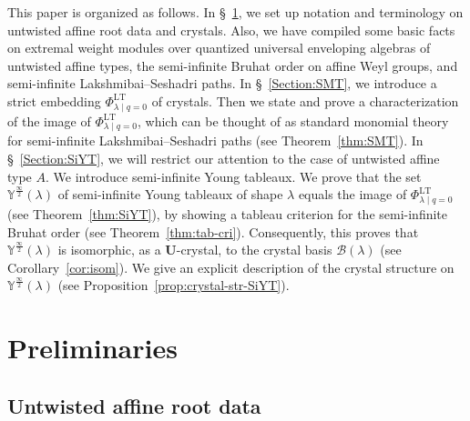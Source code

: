 \documentclass[ALCO,ThmDefs,Unicode,epreuves]{cedram}
\renewcommand{\U}{\mathbf{U}}
\newcommand{\si}{\frac{\infty}{2}}
\DeclareMathOperator{\LT}{LT}
\begin{document}
This paper is organized as follows. 
In \S~\ref{Section:Weyl}, 
we set up notation and terminology on 
untwisted affine root data and crystals. 
Also, we have compiled some basic facts on 
extremal weight modules over quantized universal enveloping algebras of untwisted affine types, 
the semi-infinite Bruhat order on affine Weyl groups, 
and semi-infinite Lakshmibai--Seshadri paths. 
In \S~\ref{Section:SMT}, 
we introduce a strict embedding 
$\Phi_{\lambda \mid q=0}^{\LT }$ 
of crystals. 
Then we state and prove a characterization of the image of 
$\Phi_{\lambda \mid q=0}^{\LT }$, 
which can be thought of as standard monomial theory for 
semi-infinite Lakshmibai--Seshadri paths (see Theorem~\ref{thm:SMT}). 
In \S~\ref{Section:SiYT}, 
we will restrict our attention to the case of 
untwisted affine type $A$. 
We introduce semi-infinite Young tableaux. 
We prove that the set 
$\mathbb{Y}^{\si}(\lambda)$ 
of semi-infinite Young tableaux of shape $\lambda$ 
equals the image of 
$\Phi_{\lambda \mid q=0}^{\LT }$
(see Theorem~\ref{thm:SiYT}), 
by showing a tableau criterion for the semi-infinite Bruhat order 
(see Theorem~\ref{thm:tab-cri}). 
Consequently, this proves that 
$\mathbb{Y}^{\si}(\lambda)$ 
is isomorphic, as a $\U$-crystal, to the crystal basis 
$\mathcal{B}(\lambda)$ 
(see Corollary~\ref{cor:isom}). 
We give an explicit description of the crystal structure on 
$\mathbb{Y}^{\si}(\lambda)$ 
(see Proposition~\ref{prop:crystal-str-SiYT}). 

\section{Preliminaries} \label{Section:Weyl}

\subsection{Untwisted affine root data}
\end{document}
